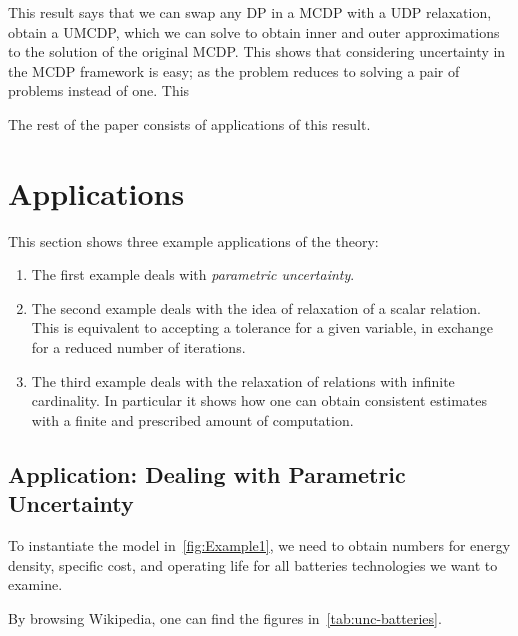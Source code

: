 This result says that we can swap any DP in a MCDP with a UDP relaxation,
obtain a UMCDP, which we can solve to obtain inner and outer approximations
to the solution of the original MCDP. This shows that considering
uncertainty in the MCDP framework is easy; as the problem reduces
to solving a pair of problems instead of one. This

The rest of the paper consists of applications of this result.


\section{Applications\label{sec:Applications}}

This section shows three example applications of the theory:
\begin{enumerate}
    \item The first example deals with \emph{parametric uncertainty}.
    \item The second example deals with the idea of relaxation of a scalar relation.
    This is equivalent to accepting a tolerance for a given variable,
    in exchange for a reduced number of iterations.
    \item The third example deals with the relaxation of relations with infinite
    cardinality. In particular it shows how one can obtain consistent
    estimates with a finite and prescribed amount of computation.
\end{enumerate}


\subsection{Application: Dealing with Parametric Uncertainty\label{sec:Application-uncertainty}}

To instantiate the model in~\cref{fig:Example1}, we need to
obtain numbers for energy density, specific cost, and operating life
for all batteries technologies we want to examine.

By browsing Wikipedia, one can find the figures in~\cref{tab:unc-batteries}.

